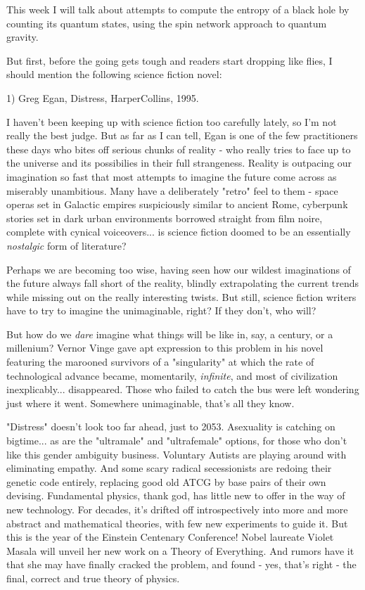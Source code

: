 

This week I will talk about attempts to compute the entropy of a
black hole by counting its quantum states, using the spin network 
approach to quantum gravity.

But first, before the going gets tough and readers start dropping like
flies, I should mention the following science fiction novel:

1) Greg Egan, Distress, HarperCollins, 1995.

I haven't been keeping up with science fiction too carefully lately, so
I'm not really the best judge.  But as far as I can tell, Egan is one of
the few practitioners these days who bites off serious chunks of reality
- who really tries to face up to the universe and its possibilies in
their full strangeness.  Reality is outpacing our imagination so fast
that most attempts to imagine the future come across as miserably
unambitious.  Many have a deliberately "retro" feel to them - space
operas set in Galactic empires suspiciously similar to ancient Rome,
cyberpunk stories set in dark urban environments borrowed straight from
film noire, complete with cynical voiceovers... is science fiction
doomed to be an essentially \emph{nostalgic} form of literature?

Perhaps we are becoming too wise, having seen how our wildest
imaginations of the future always fall short of the reality, blindly
extrapolating the current trends while missing out on the really
interesting twists.  But still, science fiction writers have to try to
imagine the unimaginable, right?  If they don't, who will?

But how do we \emph{dare} imagine what things will be like in, say, a
century, or a millenium?  Vernor Vinge gave apt expression to this
problem in his novel featuring the marooned survivors of a "singularity"
at which the rate of technological advance became, momentarily,
\emph{infinite}, and most of civilization inexplicably... disappeared.  Those
who failed to catch the bus were left wondering just where it went.
Somewhere unimaginable, that's all they know.

"Distress" doesn't look too far ahead, just to 2053.  Asexuality is
catching on bigtime... as are the "ultramale" and "ultrafemale" options,
for those who don't like this gender ambiguity business.  Voluntary
Autists are playing around with eliminating empathy.  And some scary
radical secessionists are redoing their genetic code entirely, replacing
good old ATCG by base pairs of their own devising.  Fundamental physics,
thank god, has little new to offer in the way of new technology.  For
decades, it's drifted off introspectively into more and more abstract
and mathematical theories, with few new experiments to guide it.  But
this is the year of the Einstein Centenary Conference!  Nobel laureate
Violet Masala will unveil her new work on a Theory of Everything.  And
rumors have it that she may have finally cracked the problem, and found
- yes, that's right - the final, correct and true theory of physics.

